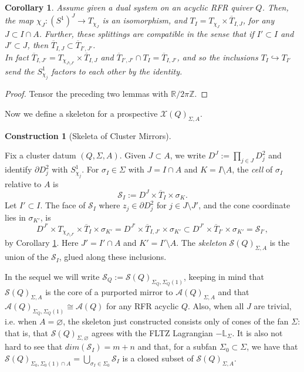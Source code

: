 \documentclass[11pt]{amsart}
\newtheorem{cor}[thm]{Corollary}
\theoremstyle{definition}
\newtheorem{con}[thm]{Construction}
\theoremstyle{remark}
\renewcommand{\emptyset}{\varnothing}
\numberwithin{equation}{section}
\begin{document}
\begin{cor}\label{compatible splitting}
    Assume given a dual system on an acyclic RFR quiver $Q$. Then, the map $\chi_J\colon(S^1)^J\to T_{\chi_J}$ is an isomorphism, and $T_I=T_{\chi_J}\times \overline{T}_{I,J}$, for any $J \subset I \cap A$. Further, these splittings are compatible in the sense that if $I'\subset I$ and $J'\subset J$, then $\overline{T}_{I,J}\subset \overline{T}_{I',J'}$.\\
    
    In fact $\overline{T}_{I,J'}=T_{\chi_{J\setminus J'}}\times \overline{T}_{I,J}$ and $\overline{T} _{I',J'}\cap T_I= \overline{T}_{I,J'}$, and so the inclusions $T_I\hookrightarrow T_{I'}$ send the $S^1_{\chi_j}$ factors to each other by the identity.
\end{cor}

\begin{proof}
    Tensor the preceding two lemmas with $\mathbb{R}/2\pi\mathbb{Z}$.
\end{proof}

Now we define a skeleton for a prospective $\mathcal{X}(Q)_{\Sigma, A}$.

\begin{con}[Skeleta of Cluster Mirrors]\label{Weinstein from Fan}

Fix a cluster datum $(Q, \Sigma, A)$. Given $J \subset A$, we write $D^J:=\prod_{j\in J}D^2_j$ and identify $\partial D^2_j$ with $S^1_{\chi_j}$. For $\sigma_I\in\Sigma$ with $J=I\cap A$ and $K=I\setminus A$, the \emph{cell} of $\sigma_I$ relative to $A$ is $$
\mathcal S_I:=D^J\times \overline{T}_I\times\sigma_K.$$
Let $I'\subset I$. The face of $\mathcal S_I$ where $z_j\in\partial D^2_j$ for $j\in J\setminus J'$, and the cone coordinate lies in $\sigma_{K'}$, is
\[
D^{J'}\times T_{\chi_{J\setminus J'}}\times \overline{T}_I\times\sigma_{K'}=D^{J'}\times \overline{T}_{I,J'}\times\sigma_{K'}\subset D^{J'}\times \overline{T}_{I'}\times\sigma_{K'}=\mathcal S_{I'},
\]
by Corollary \ref{compatible splitting}. Here $J'=I'\cap A$ and $K'=I'\setminus A$. The \emph{skeleton} $\mathcal S(Q)_{\Sigma,A}$ is the union of the $\mathcal S_I$, glued along these inclusions.
\end{con}

 In the sequel we will write $\mathcal S_Q:=\mathcal S(Q)_{\Sigma_Q,\Sigma_Q(1)}$, keeping in mind that $\mathcal{S}(Q)_{\Sigma, A}$ is the core of a purported mirror to $\mathcal{A}(Q)_{\Sigma, A}$ and that $\mathcal{A}(Q)_{\Sigma_Q, \Sigma_Q(1)} \cong \mathcal{A}(Q)$ for any RFR acyclic $Q$. Also, when all $J$ are trivial, i.e. when $A = \emptyset$, the skeleton just constructed consists only of cones of the fan $\Sigma$: that is, that $\mathcal{S}(Q)_{\Sigma, \emptyset}$ agrees with the FLTZ Lagrangian $-\mathbb{L}_\Sigma$. It is also not hard to see that $dim (\mathcal{S}_I) = m + n$ and that, for a subfan $\Sigma_0 \subset \Sigma$, we have that $\mathcal{S}(Q)_{\Sigma_0, \Sigma_0(1) \cap A} = \bigcup_{\sigma_I \in \Sigma_0} \mathcal{S}_I$ is a closed subset of $\mathcal{S}(Q)_{\Sigma, A}$.\\
\end{document}

